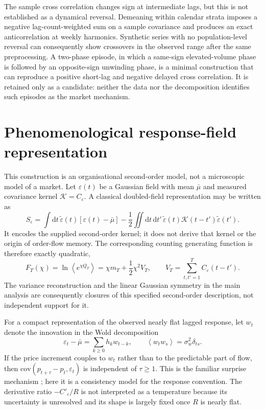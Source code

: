 \documentclass[aps,pre,onecolumn,superscriptaddress,floatfix,nofootinbib]{revtex4-2}
\newcommand{\avg}[1]{\left\langle #1 \right\rangle}
\newcommand{\eps}{\varepsilon}
\newcommand{\dd}{\mathrm{d}}
\begin{document}
The sample cross correlation changes sign at intermediate lags, but this is not
established as a dynamical reversal. Demeaning within calendar strata imposes a
negative lag-count-weighted sum on a sample covariance and produces an exact
anticorrelation at weekly harmonics. Synthetic series with no population-level
reversal can consequently show crossovers in the observed range after the same
preprocessing. A two-phase episode, in which a same-sign elevated-volume phase
is followed by an opposite-sign unwinding phase, is a minimal construction that
can reproduce a positive short-lag and negative delayed cross correlation. It
is retained only as a candidate: neither the data nor the decomposition
identifies such episodes as the market mechanism.

\section{Phenomenological response-field representation}

This construction is an organisational second-order model, not a microscopic
model of a market. Let $\eps(t)$ be a Gaussian field with mean $\bar\mu$ and
measured covariance kernel $\mathcal K=C_\eps$. A classical doubled-field
representation may be written as
\begin{equation}
 S_\eps=\int\!\dd t\,\tilde\eps(t)[\eps(t)-\bar\mu]
 -\frac12\iint\!\dd t\,\dd t'\,
 \tilde\eps(t)\mathcal K(t-t')\tilde\eps(t').
\end{equation}
It encodes the supplied second-order kernel; it does not derive that kernel or
the origin of order-flow memory. The corresponding counting generating
function is therefore exactly quadratic,
\begin{equation}
 F_T(\chi)=\ln\avg{e^{\chi Q_T}}
 =\chi m_T+\frac12\chi^2V_T,
 \qquad
 V_T=\sum_{t,t'=1}^{T}C_\eps(t-t').
\end{equation}
The variance reconstruction and the linear Gaussian symmetry in the main
analysis are consequently closures of this specified second-order description,
not independent support for it.

For a compact representation of the observed nearly flat lagged response, let
$w_t$ denote the innovation in the Wold decomposition
\begin{equation}
 \eps_t-\bar\mu=\sum_{k\geq0}h_k w_{t-k},\qquad
 \avg{w_t w_s}=\sigma_w^2\delta_{ts}.
\end{equation}
If the price increment couples to $w_t$ rather than to the predictable part of
flow, then $\mathrm{cov}(p_{t+\tau}-p_t,\eps_t)$ is independent of
$\tau\geq1$. This is the familiar surprise mechanism
\cite{gerig2008,jaisson2014,muhlekarbe2026}; here it is a consistency model for
the response convention. The derivative ratio $-C'_\eps/R$ is not interpreted
as a temperature because its uncertainty is unresolved and its shape is largely
fixed once $R$ is nearly flat.


\FloatBarrier



\end{document}
